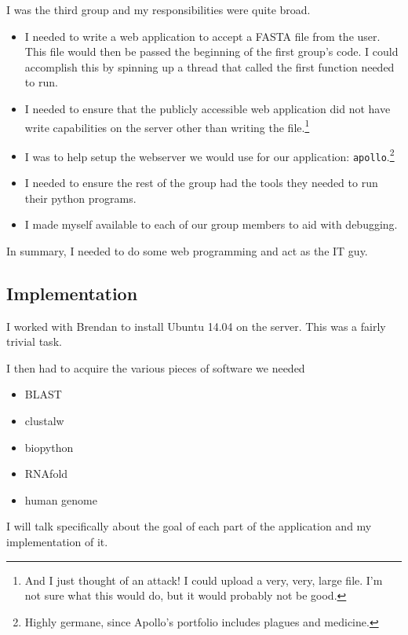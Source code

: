 \documentclass[10pt,letterpaper]{article}
\begin{document}
I was the third group and my responsibilities were quite broad.
\begin{itemize}
	\item I needed to write a web application to accept a FASTA file from the user.
	This file would then be passed the beginning of the first group's code. 
	I could accomplish this by spinning up a thread that called the first function needed to run.
	\item I needed to ensure that the publicly accessible web application did not have write capabilities on the server other than writing the file.\footnote{And I just thought of an attack!  I could upload a very, very, large file.  I'm not sure what this would do, but it would probably not be good.} 
	\item I was to help setup the webserver we would use for our application: \texttt{apollo}.\footnote{Highly germane, since Apollo's portfolio includes plagues and medicine.}
	\item I needed to ensure the rest of the group had the tools they needed to run their python programs.
	\item I made myself available to each of our group members to aid with debugging.
\end{itemize}
In summary, I needed to do some web programming and act as the IT guy.



\subsection{Implementation}
I worked with Brendan to install Ubuntu 14.04 on the server. 
This was a fairly trivial task.

I then had to acquire the various pieces of software we needed

\begin{itemize}
	\item BLAST \cite{blast}
	\item clustalw \cite{thompson2002multiple}
	\item biopython \cite{cock2009biopython}
	\item RNAfold \cite{lorenz2011viennarna}
	\item human genome
\end{itemize}



I will talk specifically about the goal of each part of the application and my implementation of it.
\end{document}
